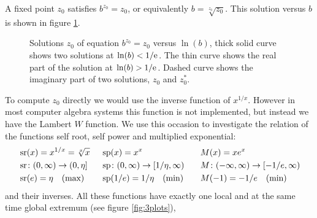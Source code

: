 \documentclass{article}
\numberwithin{equation}{section}
\begin{document}
A fixed point $z_0$ satisfies $b^{z_0}=z_0$, or equivalently
$b=\sqrt[z_0]{z_0}$.
This solution versus $b$ is shown in figure \ref{figLb}.
\begin{figure}

\begin{center}

\end{center}
\caption{\label{figLb}
Solutions $z_0$ of equation $b^{z_0}=z_0$ versus $\ln (b)$, thick solid 
curve  shows two solutions at
$\ln(b)<1/\rm e$. The thin curve shows the real part of the solution at 
$\ln(b)>1/\rm e$.
Dashed curve shows the imaginary part of two solutions, $z_0$ and $z_0^*$. 
}
\end{figure}
To compute $z_0$ directly we would use the inverse
function of $x^{1/x}$. However in most computer algebra systems this
function is not implemented, but instead we have the Lambert $W$
function. We use this occasion to investigate the relation
of the functions self root, self power and multiplied exponential:
\newcommand{\sfpw}{\operatorname{sp}}
\newcommand{\xexp}{M}
\begin{align*}
  &\sfrt(x)=x^{1/x}=\sqrt[x]{x}&&\sfpw(x)=x^x&&\xexp(x)=xe^x\\
  &\sfrt\colon (0,\infty)\to (0,\eta]& &\sfpw\colon (0,\infty)\to
[1/\eta,\infty)&& \xexp\colon (-\infty,\infty)\to [-1/e,\infty)\\
  &\sfrt(e)=\eta\mt{(max)}& &\sfpw(1/e)=1/\eta\mt{(min)} & &\xexp(-1)=-1/e\mt{(min)}
\end{align*}
and their inverses. All these functions have exactly one local and at
the same time global extremum (see figure \ref{fig:3plots}), 
\end{document}
